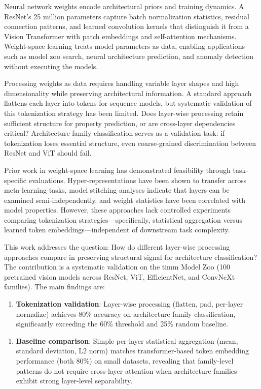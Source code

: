 
Neural network weights encode architectural priors and training dynamics. A ResNet's 25 million parameters capture batch normalization statistics, residual connection patterns, and learned convolution kernels that distinguish it from a Vision Transformer with patch embeddings and self-attention mechanisms. Weight-space learning treats model parameters as data, enabling applications such as model zoo search, neural architecture prediction, and anomaly detection without executing the models.

Processing weights as data requires handling variable layer shapes and high dimensionality while preserving architectural information. A standard approach flattens each layer into tokens for sequence models, but systematic validation of this tokenization strategy has been limited. Does layer-wise processing retain sufficient structure for property prediction, or are cross-layer dependencies critical? Architecture family classification serves as a validation task: if tokenization loses essential structure, even coarse-grained discrimination between ResNet and ViT should fail.

Prior work in weight-space learning has demonstrated feasibility through task-specific evaluations. Hyper-representations have been shown to transfer across meta-learning tasks, model stitching analyses indicate that layers can be examined semi-independently, and weight statistics have been correlated with model properties. However, these approaches lack controlled experiments comparing tokenization strategies---specifically, statistical aggregation versus learned token embeddings---independent of downstream task complexity.

This work addresses the question: How do different layer-wise processing approaches compare in preserving structural signal for architecture classification? The contribution is a systematic validation on the timm Model Zoo (100 pretrained vision models across ResNet, ViT, EfficientNet, and ConvNeXt families). The main findings are:

\begin{enumerate}
\item \textbf{Tokenization validation}: Layer-wise processing (flatten, pad, per-layer normalize) achieves 80\% accuracy on architecture family classification, significantly exceeding the 60\% threshold and 25\% random baseline.
\end{enumerate}

\begin{enumerate}
\item \textbf{Baseline comparison}: Simple per-layer statistical aggregation (mean, standard deviation, L2 norm) matches transformer-based token embedding performance (both 80\%) on small datasets, revealing that family-level patterns do not require cross-layer attention when architecture families exhibit strong layer-level separability.
\end{enumerate}

